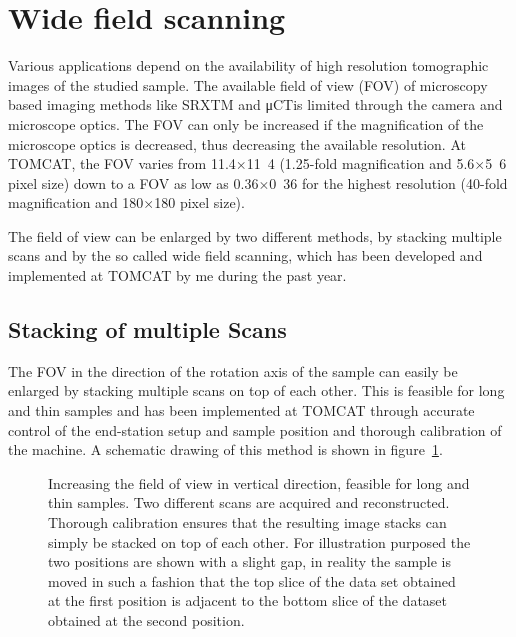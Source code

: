 \documentclass[]{scrartcl}
\begin{document}
\section{Wide field scanning}
\label{sec:wide field scanning}
Various applications depend on the availability of high resolution tomographic images of the studied sample. The available field of view (FOV) of microscopy based imaging methods like SRXTM and \unit{\micro CT}{is} limited through the camera and microscope optics. The FOV can only be increased if the magnification of the microscope optics is decreased, thus decreasing the available resolution. At TOMCAT, the FOV varies from 11.4$\times$\unit{11.4}{\milli\meter} (1.25-fold magnification and 5.6$\times$\unit{5.6}{\micro\meter} pixel size) down to a FOV as low as 0.36$\times$\unit{0.36}{\milli\meter} for the highest resolution (40-fold magnification and 180$\times$\unit{180}{\nano\meter} pixel size).

The field of view can be enlarged by two different methods, by stacking multiple scans and by the so called wide field scanning, which has been developed and implemented at TOMCAT by me during the past year.

\subsection{Stacking of multiple Scans}
The FOV in the direction of the rotation axis of the sample can easily be enlarged by stacking multiple scans on top of each other. This is feasible for long and thin samples and has been implemented at TOMCAT through accurate control of the end-station setup and sample position and thorough calibration of the machine. A schematic drawing of this method is shown in figure~\ref{fig:stacking}.

\begin{figure}[tb]
	\centering
		
	\caption{Increasing the field of view in vertical direction, feasible for long and thin samples. Two different scans are acquired and reconstructed. Thorough calibration ensures that the resulting image stacks can simply be stacked on top of each other. For illustration purposed the two positions are shown with a slight gap, in reality the sample is moved in such a fashion that the top slice of the data set obtained at the first position is adjacent to the bottom slice of the dataset obtained at the second position.}
	\label{fig:stacking}
\end{figure}
\end{document}

